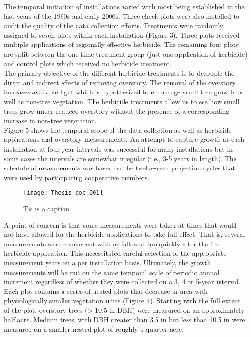 \documentclass[10pt, letterpaper, fleqn]{article}
\begin{document}
The temporal initiation of installations varied with most being established in the last years of the 1990s and early 2000s.  Three check plots were also installed to audit the quality of the data collection efforts. Treatments were randomly assigned to seven plots within each installation (Figure 3).  Three plots received multiple applications of regionally effective herbicide.  The remaining four plots are split between the one-time treatment group (just one application of herbicide) and control plots which received no herbicide treatment.\\[2pt]
\noindent 
The primary objective of the different herbicide treatments is to decouple the direct and indirect effects of removing overstory. The removal of the overstory increases available light which is hypothesized to encourage small tree growth as well as non-tree vegetation.  The herbicide treatments allow us to see how small trees grow under reduced overstory without the presence of a corresponding increase in non-tree vegetation.\\[2pt]
\noindent 
Figure 5 shows the temporal scope of the data collection as well as herbicide applications and overstory measurements. An attempt to capture growth at each installation at four year intervals was successful for many installations but in some cases the intervals are somewhat irregular (i.e., 3-5 years in length). The schedule of measurements was based on the twelve-year projection cycles that were used by participating cooperative members.\\[2pt]
\begin{figure}
\begin{center}
\texttt{[image: Thesis\_doc-001]}
\caption{Tis is a caption}
\end{center}
\end{figure}
\noindent 
A point of concern is that some measurements were taken at times that would not have allowed for the herbicide applications to take full effect. That is, several measurements were concurrent with or followed too quickly after the first herbicide application.  This necessitated careful selection of the appropriate measurement years on a per installation basis.  Ultimately, the growth measurements will be put on the same temporal scale of periodic annual increment regardless of whether they were collected on a 3, 4 or 5-year interval. \\[2pt]
\noindent 
Each plot contains a series of nested plots that decrease in area with physiologically smaller vegetation units (Figure 4). Starting with the full extent of the plot, overstory trees (> 10.5 in DBH) were measured on an approximately half acre. Medium trees, with DBH greater than 3.5 in but less than 10.5 in were measured on a smaller nested plot of roughly a quarter acre.
\end{document}
